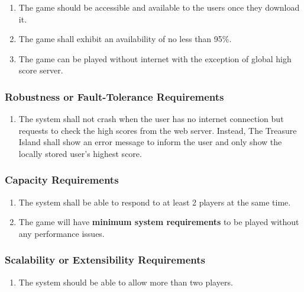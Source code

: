 \documentclass[]{article}
\begin{document}
\begin{enumerate}[{PR}1. ]
	\item The game should be accessible and available to the users once they download it.
	\item The game shall exhibit an availability of no less than 95\%.
	\item The game can be played without internet with the exception of global high score server.
\end{enumerate}


\subsubsection{Robustness or Fault-Tolerance Requirements}
\label{ssub:robustness_or_fault_tolerance_requirements}

\begin{enumerate}[{PR}1. ]
	\item The system shall not crash when the user has no internet connection but requests to check the high scores from the web server. Instead, The Treasure Island shall show an error message to inform the user and only show the locally stored user's highest score.
\end{enumerate}


\subsubsection{Capacity Requirements}
\label{ssub:capacity_requirements}

\begin{enumerate}[{PR}1. ]
	\item The system shall be able to respond to at least 2 players at the same time.
	\item The game will have \textbf{minimum system requirements} to be played without any performance issues.
\end{enumerate}


\subsubsection{Scalability or Extensibility Requirements}
\label{ssub:scalability_or_extensibility_requirements}

\begin{enumerate}[{PR}1. ]
	\item The system should be able to allow more than two players.
\end{enumerate}
\end{document}
